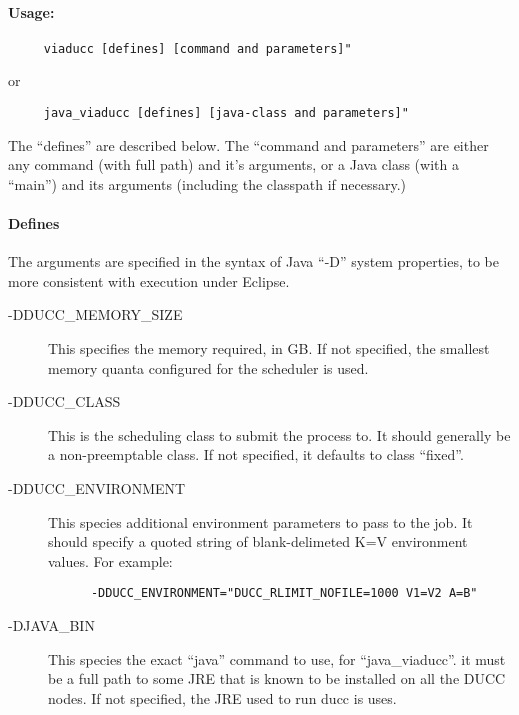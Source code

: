    \paragraph{Usage:}
\begin{verbatim}
     viaducc [defines] [command and parameters]"
\end{verbatim}
     or
\begin{verbatim}
     java_viaducc [defines] [java-class and parameters]"
\end{verbatim}

     The ``defines'' are described below.  The ``command and parameters'' are either any command
     (with full path) and it's arguments, or a Java class (with a ``main'') and its arguments (including
     the classpath if necessary.)

     \paragraph{Defines}

     The arguments are specified in the syntax of Java ``-D'' system properties, to be more consistent
     with execution under Eclipse.
     \begin{description}
         \item[-DDUCC\_MEMORY\_SIZE] This specifies the memory required, in GB.  If not specified, the
           smallest memory quanta configured for the scheduler is used.
         \item[-DDUCC\_CLASS] This is the scheduling class to submit the process to.  It should generally
           be a non-preemptable class.  If not specified, it defaults to class ``fixed''.
         \item[-DDUCC\_ENVIRONMENT] This species additional environment parameters to pass to the job.
           It should specify a quoted string of blank-delimeted K=V environment values.  For example:
\begin{verbatim}
      -DDUCC_ENVIRONMENT="DUCC_RLIMIT_NOFILE=1000 V1=V2 A=B"
\end{verbatim}
         \item[-DJAVA\_BIN] This species the exact ``java'' command to use, for ``java\_viaducc''.  it
           must be a full path to some JRE that is known to be installed on all the DUCC nodes.  If not
           specified, the JRE used to run ducc is uses.
    \end{description}
        
